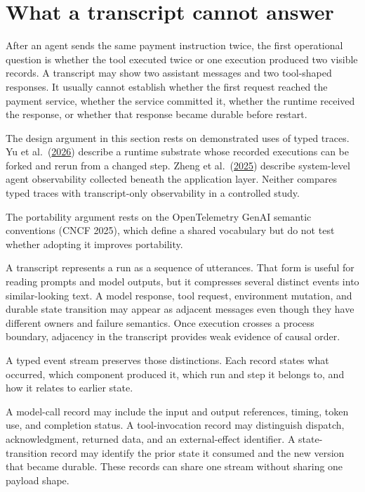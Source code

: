 \section{What a transcript cannot answer}\label{what-a-transcript-cannot-answer}

After an agent sends the same payment instruction twice, the first operational question is whether the tool executed twice or one execution produced two visible records. A transcript may show two assistant messages and two tool-shaped responses. It usually cannot establish whether the first request reached the payment service, whether the service committed it, whether the runtime received the response, or whether that response became durable before restart.

The design argument in this section rests on demonstrated uses of typed traces. Yu et al.~(\href{https://arxiv.org/abs/2605.10913}{2026}) describe a runtime substrate whose recorded executions can be forked and rerun from a changed step. Zheng et al.~(\href{https://arxiv.org/abs/2508.02736}{2025}) describe system-level agent observability collected beneath the application layer. Neither compares typed traces with transcript-only observability in a controlled study.

The portability argument rests on the OpenTelemetry GenAI semantic conventions (CNCF 2025), which define a shared vocabulary but do not test whether adopting it improves portability.

A transcript represents a run as a sequence of utterances. That form is useful for reading prompts and model outputs, but it compresses several distinct events into similar-looking text. A model response, tool request, environment mutation, and durable state transition may appear as adjacent messages even though they have different owners and failure semantics. Once execution crosses a process boundary, adjacency in the transcript provides weak evidence of causal order.

A typed event stream preserves those distinctions. Each record states what occurred, which component produced it, which run and step it belongs to, and how it relates to earlier state.

A model-call record may include the input and output references, timing, token use, and completion status. A tool-invocation record may distinguish dispatch, acknowledgment, returned data, and an external-effect identifier. A state-transition record may identify the prior state it consumed and the new version that became durable. These records can share one stream without sharing one payload shape.


